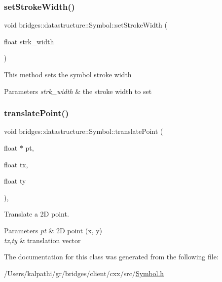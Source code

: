 \subsubsection{\texorpdfstring{set\+Stroke\+Width()}{setStrokeWidth()}}
{\footnotesize\ttfamily void bridges\+::datastructure\+::\+Symbol\+::set\+Stroke\+Width (\begin{DoxyParamCaption}\item[{float}]{strk\+\_\+width }\end{DoxyParamCaption})\hspace{0.3cm}{\ttfamily [inline]}}

This method sets the symbol stroke width


\begin{DoxyParams}{Parameters}
{\em strk\+\_\+width} & the stroke width to set \\
\hline
\end{DoxyParams}
\mbox{\label{classbridges_1_1datastructure_1_1_symbol_a3331549f82faa00d8fee5f51ca547cb0}} 
\subsubsection{\texorpdfstring{translate\+Point()}{translatePoint()}}
{\footnotesize\ttfamily void bridges\+::datastructure\+::\+Symbol\+::translate\+Point (\begin{DoxyParamCaption}\item[{float $\ast$}]{pt,  }\item[{float}]{tx,  }\item[{float}]{ty }\end{DoxyParamCaption})\hspace{0.3cm}{\ttfamily [inline]}, {\ttfamily [protected]}}



Translate a 2D point. 


\begin{DoxyParams}{Parameters}
{\em pt} & 2D point (x, y) \\
\hline
{\em tx,ty} & translation vector \\
\hline
\end{DoxyParams}


The documentation for this class was generated from the following file\+:\begin{DoxyCompactItemize}
\item 
/\+Users/kalpathi/gr/bridges/client/cxx/src/\mbox{\hyperlink{_symbol_8h}{Symbol.\+h}}\end{DoxyCompactItemize}
